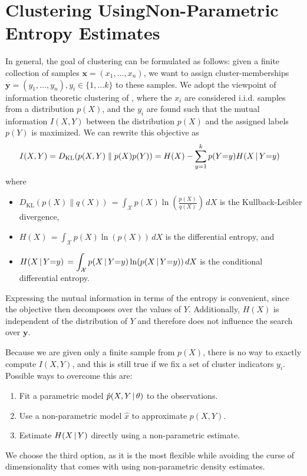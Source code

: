 \section[Clustering Using Non-Parametric Entropy Estimates]{Clustering Using\linebreak Non-Parametric Entropy Estimates}
In general, the goal of clustering can be formulated as follows: 
given a finite collection of samples $\mathbf{x} = (x_1, \dotsc, x_n)$, we want to 
assign cluster-memberships $\mathbf{y} = (y_1, \dotsc, y_n ), y_i \in \{1, \dotsc k\}$ to these samples.
%
We adopt the viewpoint of information theoretic clustering of \citet{gokcay2002information}, 
where the $x_i$ are considered i.i.d{.} samples from a distribution $p(X)$, and the 
$y_i$ are found such that the mutual information $I(X, Y)$ between the distribution $p(X)$ and the
assigned labels $p(Y)$ is maximized.
We can rewrite this objective as 
\begin{align}
         I(X, Y)
        &= D_{\text{KL}}(p(X, Y) \parallel p(X) p(Y)) = H(X) - \sum_{y=1}^k p(Y{=}y) H(X \, | \, Y {=} y)
\end{align}
where
\begin{itemize}
    \item $\displaystyle D_\text{KL}(p(X) \parallel q(X))\, = \int_\mathcal{X} p(X) \ln\left(\frac{p(X)}{q(X)}\right)\,dX$ is the Kullback-Leibler divergence,
\item $\displaystyle H(X)\, = \int_\mathcal{X} p(X) \ln(p(X))\,dX$ is the differential entropy, and
\item $\displaystyle H(X \, | \, Y{=}y)\, = \int_\mathcal{X} p(X \, | \, Y {=}y) \ln(p(X \, | \, Y {=} y))\,dX$ is the conditional differential entropy.
    \end{itemize}
Expressing the mutual information in terms of the entropy is convenient, since
the objective then decomposes over the values of $Y$. 
%
Additionally, $H(X)$ is independent of the distribution of $Y$ and therefore
does not influence the search over $\mathbf{y}$.

Because we are given only a finite sample from $p(X)$, there is no way to
exactly compute $I(X, Y)$, and this is still true if we fix a set of cluster
indicators $y_i$.
%
Possible ways to overcome this are:
\begin{enumerate}
    \item Fit a parametric model $\hat{p}(X, Y \, | \, \theta)$ to the observations.
    \item Use a non-parametric model $\hat{x}$ to approximate $p(X, Y)$. 
    \item Estimate $H(X \, | \, Y)$ directly using a non-parametric estimate.
\end{enumerate}
We choose the third option, as it is the most flexible while avoiding
the curse of dimensionality that comes with using non-parametric density estimates.

